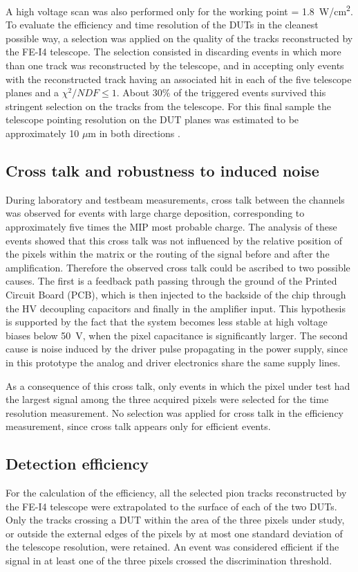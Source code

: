 		A high voltage scan was also performed only for the working point \power = \SI{1.8}{\watt/\centi\meter^2}. 
		To evaluate the efficiency and time resolution of the DUTs in the cleanest possible way, a selection was applied on the quality of the tracks reconstructed by the FE-I4 telescope. The selection consisted in discarding events in which more than one track was reconstructed by the telescope, and in accepting only events with the reconstructed track having an associated hit in each of the five telescope planes and a $ \chi^{2}/NDF \le 1 $. About 30\% of the triggered events survived this stringent selection on the tracks from the telescope. For this final sample the telescope pointing resolution on the DUT planes was estimated to be approximately 10 $\mu$m in both directions \cite{vicente_thesis}.

		\subsection{Cross talk and robustness to induced noise}
		During laboratory and testbeam measurements, cross talk between the channels was observed for events with large charge deposition, corresponding to approximately five times the MIP most probable charge. The analysis of these events showed that this cross talk was not influenced by the relative position of the pixels within the matrix or the routing of the signal before and after the amplification. Therefore the observed cross talk could be ascribed to two possible causes. The first is a feedback path passing through the ground of the Printed Circuit Board (PCB), which is then injected to the backside of the chip through the HV decoupling capacitors and finally in the amplifier input. This hypothesis is supported by the fact that the system becomes less stable at high voltage biases below \SI{50}{\volt}, when the pixel capacitance is significantly larger. The second cause is noise induced by the driver pulse propagating in the power supply, since in this prototype the analog and driver electronics share the same supply lines.

		As a consequence of this cross talk, only  events in which the pixel under test had the largest signal among the three acquired pixels were selected for the time resolution measurement. No selection was applied for cross talk in the efficiency measurement, since cross talk appears only for efficient events.

		\subsection{Detection efficiency}
		For the calculation of the efficiency, all the selected pion tracks reconstructed by the FE-I4 telescope were extrapolated to the surface of each of the two DUTs. Only the tracks crossing a DUT within the  area of the three pixels under study, or outside the  external edges of the pixels by at most one standard deviation of the telescope resolution, were retained. An event was considered efficient if the signal in at least one of the three pixels crossed the discrimination threshold.

